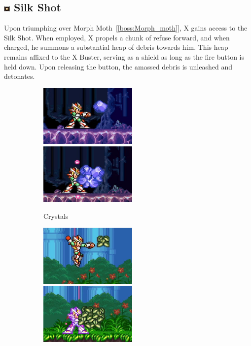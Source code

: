 \subsection{\includegraphics[width=12px, height=10px]{figures/X2/weapons/S_shot.png} Silk Shot}\label{Silk_shot}
Upon triumphing over Morph Moth~[\ref{boss:Morph_moth}], X gains access to the Silk Shot. When employed, X propels a chunk of refuse forward, and when charged, he summons a substantial heap of debris towards him. This heap remains affixed to the X Buster, serving as a shield as long as the fire button is held down. Upon releasing the button, the amassed debris is unleashed and detonates.

\begin{figure}[htp]
	\begin{subfigure}{\linewidth}
		\centering
		\includegraphics[height=3cm]{figures/X2/weapons/S_shot_1.png}	
		\includegraphics[height=3cm]{figures/X2/weapons/S_shot_2.png}	
		\caption{Crystals}	
	\end{subfigure}
	\begin{subfigure}{\linewidth}
		\centering
		\includegraphics[height=3cm]{figures/X2/weapons/S_shot_3.png}	
		\includegraphics[height=3cm]{figures/X2/weapons/S_shot_4.png}	

\end{subfigure}
\end{figure}
